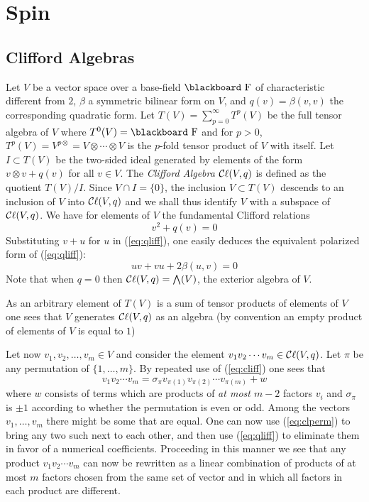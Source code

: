 \documentclass[12pt,titlepage]{article}
\def\bbf#1{\hbox{\blackboard #1}}
\def\lF{\bbf F}
\def\cC{{\cal C}}
\def\Cl{{\cC\ell}}
\begin{document}
\section{Spin}

\subsection{Clifford Algebras}\label{sec:cliffa}%
Let \(V\) be a vector space over a base-field \(\lF\) of characteristic
different from \(2\), \(\beta\) a symmetric bilinear form on \(V\), and
\(q(v)=\beta(v,v)\) the corresponding quadratic form. Let
\(T(V)=\sum_{p=0}^\infty T^p(V)\) be the full tensor algebra of \(V\)
where \(T^0(V)=\lF\) and for \(p>0\), \(T^p(V)=V^{p\otimes}=
V\otimes\cdots\otimes V\)
is the \(p\)-fold tensor product of \(V\) with itself. Let \(I\subset
T(V)\) be the two-sided ideal generated by elements of the form
\(v\otimes v + q(v)\) for all \(v\in V\). The {\em Clifford Algebra\/}
%
\(\Cl(V,q)\) is defined as the quotient \(T(V)/I\). 
Since \(V\cap I=\{0\}\),
the inclusion \(V\subset T(V)\) descends to an
 inclusion of \(V\) into \(\Cl(V,q)\) and we shall thus 
identify \(V\) with
a subspace of \(\Cl(V,q)\). We have for elements of \(V\) the
 fundamental Clifford relations
\begin{equation}\label{eq:qliff}%
v^2+q(v)=0
\end{equation}%
Substituting \(v+u\) for \(u\) in (\ref{eq:qliff}), one easily 
deduces the equivalent 
polarized form of (\ref{eq:qliff}):
\begin{equation}\label{eq:cliff}%
uv+vu+2\beta(u,v)=0
\end{equation}%
Note that when \(q=0\) then \(\Cl(V,q)=\bigwedge(V)\), the exterior
algebra of \(V\).

As an arbitrary element of \(T(V)\) is a sum
of tensor products of elements of \(V\) one sees that \(V\) generates
\(\Cl(V,q)\) as an algebra (by convention an empty product of elements
of \(V\) is equal to \(1\))

Let now \(v_1,v_2,\dots,v_m\in V\) and consider the element
\(v_1v_2\cdots v_m\in\Cl(V,q)\). Let \(\pi\) be any permutation of
\(\{1,\dots,m\}\). By repeated use of (\ref{eq:cliff}) one sees that
\begin{equation}\label{eq:clperm}%
v_1v_2\cdots v_m = \sigma_\pi v_{\pi(1)}v_{\pi(2)}\cdots v_{\pi(m)} + w
\end{equation}%
where \(w\) consists of terms which are products of {\em at most
\(m-2\)\/} factors \(v_i\) and \(\sigma_\pi\) is \(\pm 1\) according to
whether the permutation is even or odd. Among the vectors
\(v_1,\dots,v_m\) there might be some that are equal. One can now use
(\ref{eq:clperm}) to bring any two such next to each other, and then use
(\ref{eq:qliff}) to eliminate them in favor of a numerical coefficients.
Proceeding in this manner we see that any product \(v_1v_2\cdots v_m\)
can now be rewritten as a linear combination of products of at most
\(m\) factors chosen from the same set of vector
and in which all factors in each product are different.
\end{document}
